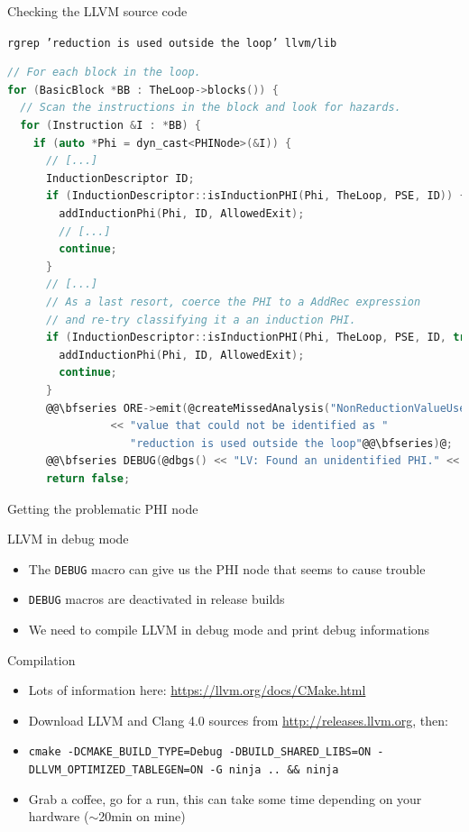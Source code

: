 \begin{frame}[fragile]{Checking the LLVM source code}
  \begin{block}{{\tt rgrep 'reduction is used outside the loop' llvm/lib}}
    \begin{lstlisting}[language=c]
// For each block in the loop.
for (BasicBlock *BB : TheLoop->blocks()) {
  // Scan the instructions in the block and look for hazards.
  for (Instruction &I : *BB) {
    if (auto *Phi = dyn_cast<PHINode>(&I)) {
      // [...]
      InductionDescriptor ID;
      if (InductionDescriptor::isInductionPHI(Phi, TheLoop, PSE, ID)) {
        addInductionPhi(Phi, ID, AllowedExit);
        // [...]
        continue;
      }
      // [...]
      // As a last resort, coerce the PHI to a AddRec expression
      // and re-try classifying it a an induction PHI.
      if (InductionDescriptor::isInductionPHI(Phi, TheLoop, PSE, ID, true)) {
        addInductionPhi(Phi, ID, AllowedExit);
        continue;
      }
      @@\bfseries ORE->emit(@createMissedAnalysis("NonReductionValueUsedOutsideLoop", Phi)
                << "value that could not be identified as "
                   "reduction is used outside the loop"@@\bfseries)@;
      @@\bfseries DEBUG(@dbgs() << "LV: Found an unidentified PHI." << *Phi << "\n"@@\bfseries)@;
      return false;
    \end{lstlisting}
  \end{block}
\end{frame}

\begin{frame}{Getting the problematic PHI node}
  \begin{block}{LLVM in debug mode}
    \begin{itemize}
      \item The {\tt DEBUG} macro can give us the PHI node that seems to cause trouble
      \item {\tt DEBUG} macros are deactivated in release builds
      \item We need to compile LLVM in debug mode and print debug informations
    \end{itemize}
  \end{block}

  \pause

  \begin{block}{Compilation}
    \begin{itemize}
      \item Lots of information here: \url{https://llvm.org/docs/CMake.html}
      \item Download LLVM and Clang 4.0 sources from \url{http://releases.llvm.org}, then:
      \item {\tt cmake -DCMAKE\_BUILD\_TYPE=Debug -DBUILD\_SHARED\_LIBS=ON -DLLVM\_OPTIMIZED\_TABLEGEN=ON -G ninja .. \&\& ninja}
      \item Grab a coffee, go for a run, this can take some time depending on your hardware ($\sim$20min on mine)
    \end{itemize}
  \end{block}
\end{frame}

